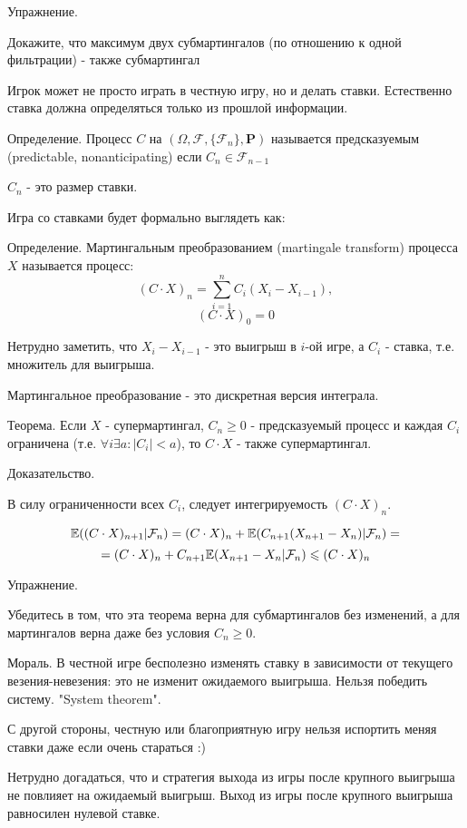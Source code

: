 {Упражнение. \par
Докажите, что максимум двух субмартингалов (по отношению к одной
фильтрации) - также субмартингал \par

Игрок может не просто играть в честную игру, но и делать ставки.
Естественно ставка должна определяться только из прошлой
информации.

Определение. Процесс $C$ на $(\Omega,\mathcal{F},\{\mathcal{F}_{n}
\}, \mathbf{P})$ называется предсказуемым (predictable,
nonanticipating) если $C_{n} \in \mathcal{F}_{n-1}$ \par

$C_{n}$ - это размер ставки.

Игра со ставками будет формально выглядеть как:

Определение. Мартингальным преобразованием (martingale transform)
процесса $X$ называется процесс:
$$
(C\cdot X)_{n}=\sum_{i=1}^{n} C_{i} (X_{i}-X_{i-1}), $$ $$ (C\cdot
X)_{0}=0
$$

Нетрудно заметить, что $X_{i}-X_{i-1}$ - это выигрыш в $i$-ой
игре, а $C_{i}$ - ставка, т.е. множитель для выигрыша. \par

Мартингальное преобразование - это дискретная версия интеграла. \par

Теорема. Если $X$ - супермартингал, $C_{n}\ge 0$ - предсказуемый
процесс и
каждая $C_{i}$ ограничена (т.е. $\forall i \exists a : |C_{i}|<a$), то $C\cdot X$ - также супермартингал. \par
Доказательство. \par
В силу ограниченности всех $C_{i}$, следует интегрируемость $(C
\cdot X)_{n}$. \par
$$
\mathbb{E}((C\cdot X)_{n+1}|\mathcal{F}_{n})=(C\cdot
X)_{n}+\mathbb{E}(C_{n+1}(X_{n+1}-X_{n})|\mathcal{F}_{n})=
$$
$$ =(C\cdot
X)_{n}+C_{n+1}\mathbb{E}(X_{n+1}-X_{n}|\mathcal{F}_{n})\leqslant (C\cdot X)_{n}
$$

Упражнение. \par
Убедитесь в том, что эта теорема верна для субмартингалов без
изменений, а для мартингалов верна даже без условия $C_{n} \ge 0$.
\par

Мораль. В честной игре бесполезно изменять ставку в зависимости от
текущего везения-невезения: это не изменит ожидаемого выигрыша.
Нельзя победить систему. "System theorem". \par
С другой стороны, честную или благоприятную игру нельзя испортить
меняя ставки даже если очень стараться :) \par
Нетрудно догадаться, что и стратегия выхода из игры после крупного
выигрыша не повлияет на ожидаемый выигрыш. Выход из игры после
крупного выигрыша равносилен нулевой ставке.  \par



}
